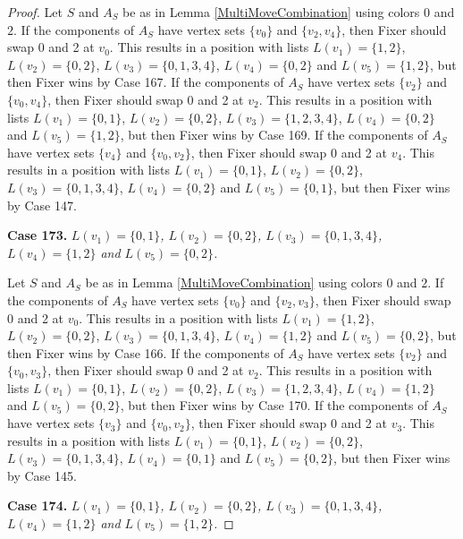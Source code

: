 \documentclass[12pt]{amsart}
\theoremstyle{plain}
\theoremstyle{definition}
\theoremstyle{remark}
\begin{document}
\begin{proof}
Let $S$ and $A_S$ be as in Lemma \ref{MultiMoveCombination} using colors $0$ and $2$. If the components of $A_S$ have vertex sets $\{v_0\}$ and $\{v_2, v_4\}$, then Fixer should swap 0 and 2 at $v_0$. This results in a position with lists $L(v_1) = \{1, 2\}$, $L(v_2) = \{0, 2\}$, $L(v_3) = \{0, 1, 3, 4\}$, $L(v_4) = \{0, 2\}$ and $L(v_5) = \{1, 2\}$, but then Fixer wins by Case 167. If the components of $A_S$ have vertex sets $\{v_2\}$ and $\{v_0, v_4\}$, then Fixer should swap 0 and 2 at $v_2$. This results in a position with lists $L(v_1) = \{0, 1\}$, $L(v_2) = \{0, 2\}$, $L(v_3) = \{1, 2, 3, 4\}$, $L(v_4) = \{0, 2\}$ and $L(v_5) = \{1, 2\}$, but then Fixer wins by Case 169. If the components of $A_S$ have vertex sets $\{v_4\}$ and $\{v_0, v_2\}$, then Fixer should swap 0 and 2 at $v_4$. This results in a position with lists $L(v_1) = \{0, 1\}$, $L(v_2) = \{0, 2\}$, $L(v_3) = \{0, 1, 3, 4\}$, $L(v_4) = \{0, 2\}$ and $L(v_5) = \{0, 1\}$, but then Fixer wins by Case 147. 

\noindent\textbf{Case 173.  }\textit{$L(v_1) = \{0, 1\}$, $L(v_2) = \{0, 2\}$, $L(v_3) = \{0, 1, 3, 4\}$, $L(v_4) = \{1, 2\}$ and $L(v_5) = \{0, 2\}$.}

Let $S$ and $A_S$ be as in Lemma \ref{MultiMoveCombination} using colors $0$ and $2$. If the components of $A_S$ have vertex sets $\{v_0\}$ and $\{v_2, v_3\}$, then Fixer should swap 0 and 2 at $v_0$. This results in a position with lists $L(v_1) = \{1, 2\}$, $L(v_2) = \{0, 2\}$, $L(v_3) = \{0, 1, 3, 4\}$, $L(v_4) = \{1, 2\}$ and $L(v_5) = \{0, 2\}$, but then Fixer wins by Case 166. If the components of $A_S$ have vertex sets $\{v_2\}$ and $\{v_0, v_3\}$, then Fixer should swap 0 and 2 at $v_2$. This results in a position with lists $L(v_1) = \{0, 1\}$, $L(v_2) = \{0, 2\}$, $L(v_3) = \{1, 2, 3, 4\}$, $L(v_4) = \{1, 2\}$ and $L(v_5) = \{0, 2\}$, but then Fixer wins by Case 170. If the components of $A_S$ have vertex sets $\{v_3\}$ and $\{v_0, v_2\}$, then Fixer should swap 0 and 2 at $v_3$. This results in a position with lists $L(v_1) = \{0, 1\}$, $L(v_2) = \{0, 2\}$, $L(v_3) = \{0, 1, 3, 4\}$, $L(v_4) = \{0, 1\}$ and $L(v_5) = \{0, 2\}$, but then Fixer wins by Case 145. 

\noindent\textbf{Case 174.  }\textit{$L(v_1) = \{0, 1\}$, $L(v_2) = \{0, 2\}$, $L(v_3) = \{0, 1, 3, 4\}$, $L(v_4) = \{1, 2\}$ and $L(v_5) = \{1, 2\}$.}


\end{proof}
\end{document}

